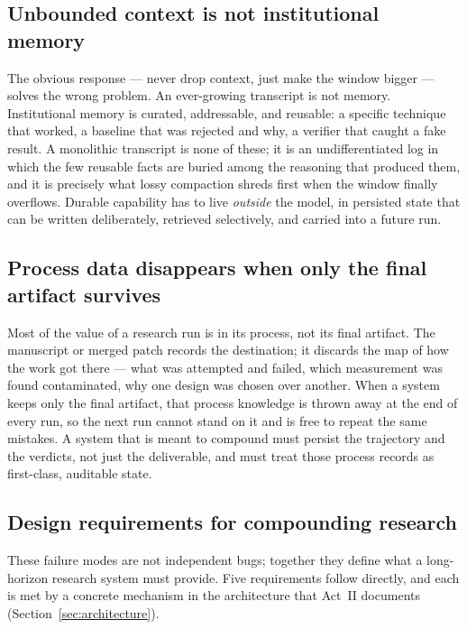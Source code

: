 \subsection{Unbounded context is not institutional memory}

The obvious response --- never drop context, just make the window bigger --- solves
the wrong problem. An ever-growing transcript is not memory. Institutional memory
is curated, addressable, and reusable: a specific technique that worked, a baseline
that was rejected and why, a verifier that caught a fake result. A monolithic
transcript is none of these; it is an undifferentiated log in which the few
reusable facts are buried among the reasoning that produced them, and it is
precisely what lossy compaction shreds first when the window finally overflows.
Durable capability has to live \emph{outside} the model, in persisted state that
can be written deliberately, retrieved selectively, and carried into a future run.

\subsection{Process data disappears when only the final artifact survives}

Most of the value of a research run is in its process, not its final artifact. The
manuscript or merged patch records the destination; it discards the map of how the
work got there --- what was attempted and failed, which measurement was found
contaminated, why one design was chosen over another. When a system keeps only the
final artifact, that process knowledge is thrown away at the end of every run, so
the next run cannot stand on it and is free to repeat the same mistakes. A system
that is meant to compound must persist the trajectory and the verdicts, not just
the deliverable, and must treat those process records as first-class, auditable
state.

\subsection{Design requirements for compounding research}

These failure modes are not independent bugs; together they define what a
long-horizon research system must provide. Five requirements follow directly, and
each is met by a concrete mechanism in the architecture that Act~II documents
(Section~\ref{sec:architecture}).

